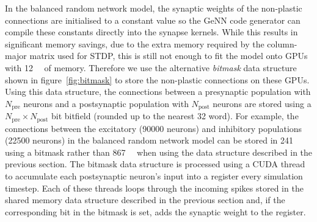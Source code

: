 \documentclass[utf8]{frontiersSCNS} %
\begin{document}
In the balanced random network model, the synaptic weights of the non-plastic connections are initialised to a constant value so the GeNN code generator can compile these constants directly into the synapse kernels. 
While this results in significant memory savings, due to the extra memory required by the column-major matrix used for STDP, this is still not enough to fit the model onto GPUs with \SI{12}{\giga\byte} of memory.
Therefore we use the alternative \textit{bitmask} data structure shown in figure~\ref{fig:bitmask} to store the non-plastic connections on these GPUs.
Using this data structure, the connections between a presynaptic population with $N_{\text{pre}}$ neurons and a postsynaptic population with $N_{\text{post}}$ neurons are stored using a $N_{\text{pre}} \times N_{\text{post}}$ bit bitfield (rounded up to the nearest \SI{32}{\bit} word).
For example, the connections between the excitatory (\num{90000} neurons) and inhibitory populations (\num{22500} neurons) in the balanced random network model can be stored in \SI{241}{\mebi\byte} using a bitmask rather than \SI{867}{\mebi\byte} when using the data structure described in the previous section.
The bitmask data structure is processed using a CUDA thread to accumulate each postsynaptic neuron's input into a register every simulation timestep.
Each of these threads loops through the incoming spikes stored in the shared memory data structure described in the previous section and, if the corresponding bit in the bitmask is set, adds the synaptic weight to the register.
\end{document}
